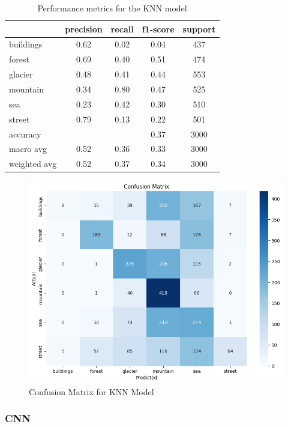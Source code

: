 \documentclass[conference]{IEEEtran}
\begin{document}
\begin{table}[ht]
\centering
\begin{tabular}{lcccc}
\toprule
\textbf{} & \textbf{precision} & \textbf{recall} & \textbf{f1-score} & \textbf{support} \\
\midrule
buildings & 0.62 & 0.02 & 0.04 & 437 \\
forest & 0.69 & 0.40 & 0.51 & 474 \\
glacier & 0.48 & 0.41 & 0.44 & 553 \\
mountain & 0.34 & 0.80 & 0.47 & 525 \\
sea & 0.23 & 0.42 & 0.30 & 510 \\
street & 0.79 & 0.13 & 0.22 & 501 \\
\midrule
accuracy & & & 0.37 & 3000 \\
macro avg & 0.52 & 0.36 & 0.33 & 3000 \\
weighted avg & 0.52 & 0.37 & 0.34 & 3000 \\
\bottomrule
\end{tabular}
\caption{Performance metrics for the KNN model}
\end{table}

\begin{figure}[H]
    \centering
    \includegraphics[width=1\linewidth]{images//KNN/CM_KNN.png}
    \caption{Confusion Matrix for KNN Model}
    \label{fig:CM_KNN}
\end{figure}

\subsubsection{CNN}
\end{document}
